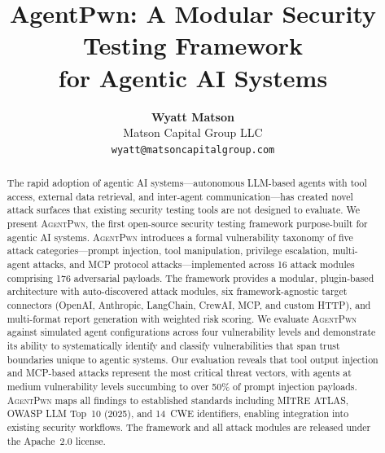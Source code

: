 \documentclass[letterpaper,twocolumn,10pt]{article}
\newcommand{\apwn}{\textsc{AgentPwn}}
\begin{document}
\title{\Large\textbf{AgentPwn: A Modular Security Testing Framework\\for Agentic AI Systems}}

\author{
  \textbf{Wyatt Matson}\\
  Matson Capital Group LLC\\
  \texttt{wyatt@matsoncapitalgroup.com}
}

\date{}
\maketitle
\thispagestyle{fancy}


\begin{abstract}
The rapid adoption of agentic AI systems---autonomous LLM-based agents with tool access, external data retrieval, and inter-agent communication---has created novel attack surfaces that existing security testing tools are not designed to evaluate.
We present \apwn{}, the first open-source security testing framework purpose-built for agentic AI systems.
\apwn{} introduces a formal vulnerability taxonomy of five attack categories---prompt injection, tool manipulation, privilege escalation, multi-agent attacks, and MCP protocol attacks---implemented across 16 attack modules comprising 176 adversarial payloads.
The framework provides a modular, plugin-based architecture with auto-discovered attack modules, six framework-agnostic target connectors (OpenAI, Anthropic, LangChain, CrewAI, MCP, and custom HTTP), and multi-format report generation with weighted risk scoring.
We evaluate \apwn{} against simulated agent configurations across four vulnerability levels and demonstrate its ability to systematically identify and classify vulnerabilities that span trust boundaries unique to agentic systems.
Our evaluation reveals that tool output injection and MCP-based attacks represent the most critical threat vectors, with agents at medium vulnerability levels succumbing to over 50\% of prompt injection payloads.
\apwn{} maps all findings to established standards including MITRE ATLAS, OWASP LLM Top~10 (2025), and 14~CWE identifiers, enabling integration into existing security workflows.
The framework and all attack modules are released under the Apache~2.0 license.
\end{abstract}
\end{document}
